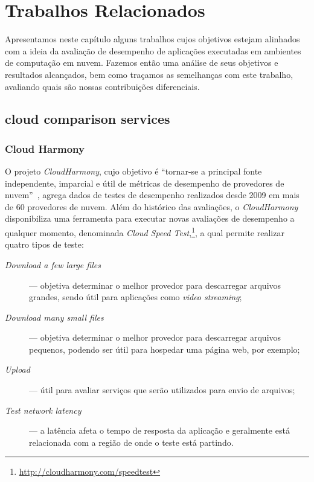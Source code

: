 \chapter[Trabalhos Relacionados]{Trabalhos Relacionados}
Apresentamos  neste capítulo alguns trabalhos cujos objetivos estejam alinhados 
com a ideia da avaliação de desempenho de aplicações executadas em ambientes de
computação em nuvem. Fazemos então uma análise de seus objetivos e resultados 
alcançados, bem como traçamos as semelhanças com este trabalho, avaliando quais são
nossas contribuições diferenciais.

\section{cloud comparison services}
\subsection{Cloud Harmony}
O projeto {\em CloudHarmony}, cujo
objetivo é ``tornar-se a principal fonte independente, imparcial e útil de
métricas de desempenho de provedores de nuvem''~\cite{cloudharmony}, agrega
dados de testes de desempenho realizados desde 2009 em mais de 60 provedores de
nuvem. Além do histórico das avaliações, o {\em CloudHarmony} disponibiliza uma ferramenta para executar novas avaliações de desempenho a qualquer momento, denominada
\textit{Cloud Speed Test},\footnote{\url{http://cloudharmony.com/speedtest}}, a qual permite realizar quatro tipos de teste:

\begin{description}
  \item[\em Download a few large files] --- objetiva determinar o melhor provedor
  para descarregar arquivos grandes, sendo útil para aplicações como {\em video
  streaming};
  \item[\em Download many small files] --- objetiva determinar o melhor provedor
  para descarregar arquivos pequenos, podendo ser útil para hospedar uma página
  web, por exemplo;
  \item[\em Upload] --- útil para avaliar serviços que serão utilizados para
  envio de arquivos;
  \item[\em Test network latency] --- a latência afeta o tempo de resposta da
  aplicação e geralmente está relacionada com a região de onde o teste está
  partindo.
\end{description}

